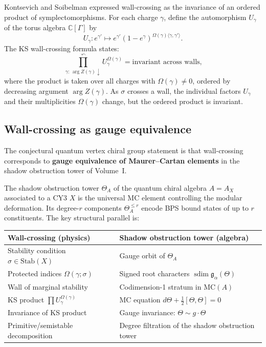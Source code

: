 \documentclass[11pt]{article}
\theoremstyle{definition}
\newcommand{\sdim}{\operatorname{sdim}}
\newcommand{\MC}{\mathrm{MC}}
\newcommand{\bC}{\mathbb{C}}
\begin{document}
Kontsevich and Soibelman expressed wall-crossing as the invariance of
an ordered product of symplectomorphisms. For each charge $\gamma$,
define the automorphism $U_\gamma$ of the torus algebra
$\bC[\Gamma]$ by
\[
 U_\gamma \colon e^{\gamma'} \mapsto
 e^{\gamma'} (1 - e^{\gamma})^{\Omega(\gamma) \langle \gamma,
 \gamma' \rangle}.
\]
The KS wall-crossing formula states:
\begin{equation}
\label{eq:ks-wcf}
 \boxed{\prod_{\gamma:\, \arg Z(\gamma) \downarrow}^{\curvearrowleft}
 U_\gamma^{\Omega(\gamma)}
 = \text{invariant across walls,}}
\end{equation}
where the product is taken over all charges with $\Omega(\gamma) \neq 0$,
ordered by decreasing argument $\arg Z(\gamma)$. As $\sigma$
crosses a wall, the individual factors $U_\gamma$ and
their multiplicities $\Omega(\gamma)$ change, but the ordered product
is invariant.

\subsection{Wall-crossing as gauge equivalence}

The conjectural quantum vertex chiral group statement is that
wall-crossing corresponds to \textbf{gauge equivalence of
Maurer--Cartan elements} in the shadow obstruction tower of Volume~I.

The shadow obstruction tower $\Theta_A$ of the quantum chiral algebra $A = A_X$
associated to a CY3 $X$ is the universal MC element controlling the
modular deformation. Its degree-$r$ components $\Theta^{\leq r}_A$
encode BPS bound states of up to $r$ constituents. The key structural
parallel is:

\begin{center}
\renewcommand{\arraystretch}{1.3}
\begin{tabular}{ll}
\textbf{Wall-crossing (physics)} & \textbf{Shadow obstruction tower (algebra)} \\
\hline
Stability condition $\sigma \in \mathrm{Stab}(X)$ &
 Gauge orbit of $\Theta_A$ \\
Protected indices $\Omega(\gamma;\sigma)$ &
 Signed root characters \(\sdim\mathfrak g_\alpha(\Theta)\) \\
Wall of marginal stability &
 Codimension-1 stratum in $\MC(A)$ \\
KS product $\prod U_\gamma^{\Omega(\gamma)}$ &
 MC equation $d\Theta + \frac{1}{2}[\Theta, \Theta] = 0$ \\
Invariance of KS product &
 Gauge invariance: $\Theta \sim g \cdot \Theta$ \\
Primitive/semistable decomposition &
 Degree filtration of the shadow obstruction tower
\end{tabular}
\end{center}
\end{document}
